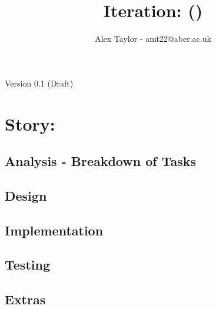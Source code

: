 \documentclass{article}
\title{Iteration: ()}
\author{Alex Taylor - amt22@aber.ac.uk}
\begin{document}
\maketitle
\begin{center}
	Version 0.1 (Draft)
\end{center}
\tableofcontents
\thispagestyle{empty}
\newpage

\section{Story: }
\subsection{Analysis - Breakdown of Tasks}
\subsection{Design}
\subsection{Implementation}
\subsection{Testing}
\subsection{Extras}
\newpage

%
%
\end{document}
